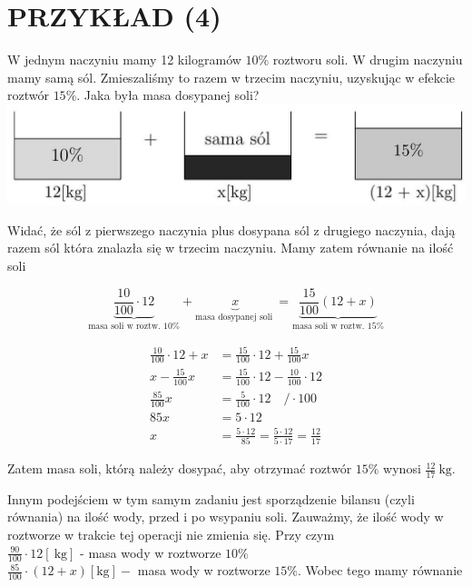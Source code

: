 \documentclass[10pt]{article}
\begin{document}
\section*{PRZYKŁAD (4)}
W jednym naczyniu mamy 12 kilogramów \(10 \%\) roztworu soli. W drugim naczyniu mamy samą sól. Zmieszaliśmy to razem w trzecim naczyniu, uzyskując w efekcie roztwór \(15 \%\). Jaka była masa dosypanej soli?\\
\includegraphics[max width=\textwidth, center]{2024_11_21_8f01584889ff06348ae7g-152}

Widać, że sól z pierwszego naczynia plus dosypana sól z drugiego naczynia, dają razem sól która znalazła się w trzecim naczyniu. Mamy zatem równanie na ilość soli

\[
\underbrace{\frac{10}{100} \cdot 12}_{\text {masa soli w roztw. } 10 \%}+\underbrace{x}_{\text {masa dosypanej soli }}=\underbrace{\frac{15}{100}(12+x)}_{\text {masa soli w roztw. } 15 \%}
\]

\[
\begin{aligned}
\frac{10}{100} \cdot 12+x & =\frac{15}{100} \cdot 12+\frac{15}{100} x \\
x-\frac{15}{100} x & =\frac{15}{100} \cdot 12-\frac{10}{100} \cdot 12 \\
\frac{85}{100} x & =\frac{5}{100} \cdot 12 \quad / \cdot 100 \\
85 x & =5 \cdot 12 \\
x & =\frac{5 \cdot 12}{85}=\frac{5 \cdot 12}{5 \cdot 17}=\frac{12}{17}
\end{aligned}
\]

Zatem masa soli, którą należy dosypać, aby otrzymać roztwór \(15 \%\) wynosi \(\frac{12}{17} \mathrm{~kg}\).

Innym podejściem w tym samym zadaniu jest sporządzenie bilansu (czyli równania) na ilość wody, przed i po wsypaniu soli. Zauważmy, że ilość wody w roztworze w trakcie tej operacji nie zmienia się. Przy czym\\
\(\frac{90}{100} \cdot 12[\mathrm{~kg}]\) - masa wody w roztworze \(10 \%\)\\
\(\frac{85}{100} \cdot(12+x)[\mathrm{kg}]-\) masa wody w roztworze \(15 \%\). Wobec tego mamy równanie
\end{document}
